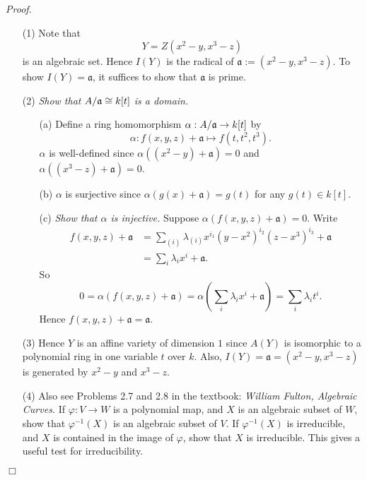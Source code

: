 \documentclass{article}
\begin{document}
\emph{Proof.}
\begin{enumerate}
\item[(1)]
  Note that
  \[
    Y = Z(x^2-y, x^3-z)
  \]
  is an algebraic set.
  Hence $I(Y)$ is the radical of $\mathfrak{a} := (x^2-y, x^3-z)$.
  To show $I(Y) = \mathfrak{a}$, it suffices to show that $\mathfrak{a}$ is prime.

\item[(2)]
  \emph{Show that $A/\frak{a} \cong k[t]$ is a domain.}
  \begin{enumerate}
  \item[(a)]
    Define a ring homomorphism $\alpha: A/\frak{a} \to k[t]$
    by
    \[
      \alpha: f(x,y,z) + \mathfrak{a} \mapsto f(t,t^2,t^3).
    \]
    $\alpha$ is well-defined since
    $\alpha((x^2-y) + \mathfrak{a}) = 0$ and
    $\alpha((x^3-z) + \mathfrak{a}) = 0$.

  \item[(b)]
    $\alpha$ is surjective
    since $\alpha(g(x) + \mathfrak{a}) = g(t)$ for any $g(t) \in k[t]$.

  \item[(c)]
    \emph{Show that $\alpha$ is injective.}
    Suppose $\alpha(f(x,y,z) + \mathfrak{a}) = 0$.
    Write
    \begin{align*}
      f(x,y,z) + \mathfrak{a}
      &= \sum_{(i)} \lambda_{(i)} x^{i_1} (y-x^2)^{i_2} (z-x^3)^{i_3} + \mathfrak{a} \\
      &= \sum_{i} \lambda_{i} x^{i} + \mathfrak{a}.
    \end{align*}
    So
    \[
      0
      = \alpha(f(x,y,z) + \mathfrak{a})
      = \alpha\left(\sum_{i} \lambda_{i} x^{i} + \mathfrak{a} \right)
      = \sum_{i} \lambda_{i} t^{i}.
    \]
    Hence $f(x,y,z) + \mathfrak{a} = \mathfrak{a}$.
  \end{enumerate}

\item[(3)]
  Hence $Y$ is an affine variety of dimension $1$
  since $A(Y)$ is isomorphic to a polynomial ring in one variable $t$ over $k$.
  Also, $I(Y) = \mathfrak{a} = (x^2-y, x^3-z)$ is generated by $x^2-y$ and $x^3-z$.


\item[(4)]
  Also see Problems 2.7 and 2.8 in the textbook:
  \emph{William Fulton, Algebraic Curves.}
  If $\varphi: V \to W$ is a polynomial map,
  and $X$ is an algebraic subset of $W$,
  show that $\varphi^{-1}(X)$ is an algebraic subset of $V$.
  If $\varphi^{-1}(X)$ is irreducible,
  and $X$ is contained in the image of $\varphi$, show that $X$ is irreducible.
  This gives a useful test for irreducibility.
\end{enumerate}
$\Box$ \\\\
\end{document}
